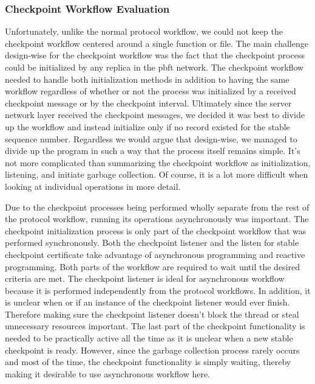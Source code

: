 \iffalse
\subsubsection{Checkpoint Workflow Evaluation}
\label{sec:checkpointEval}
Unfortunately, unlike the normal protocol workflow, we could not keep the checkpoint workflow centered around a single function or file. 
The main challenge design-wise for the checkpoint workflow was the fact that the checkpoint process could be initialized by any replica in the \ac{pbft} network. The checkpoint workflow needed to handle both initialization methods in addition to having the same workflow regardless of whether or not the process was initialized by a received checkpoint message or by the checkpoint interval. Ultimately since the server network layer received the checkpoint messages, we decided it was best to divide up the workflow and instead initialize only if no record existed for the stable sequence number. Regardless we would argue that design-wise, we managed to divide up the program in such a way that the process itself remains simple. It's not more complicated than summarizing the checkpoint workflow as initialization, listening, and initiate garbage collection. Of course, it is a lot more difficult when looking at individual operations in more detail. 

Due to the checkpoint processes being performed wholly separate from the rest of the protocol workflow, running its operations asynchronously was important. The checkpoint initialization process is only part of the checkpoint workflow that was performed synchronously. Both the checkpoint listener and the listen for stable checkpoint certificate take advantage of asynchronous programming and reactive programming. Both parts of the workflow are required to wait until the desired criteria are met. The checkpoint listener is ideal for asynchronous workflow because it is performed independently from the protocol workflows. In addition, it is unclear when or if an instance of the checkpoint listener would ever finish. Therefore making sure the checkpoint listener doesn't block the thread or steal unnecessary resources important.
The last part of the checkpoint functionality is needed to be practically active all the time as it is unclear when a new stable checkpoint is ready. However, since the garbage collection process rarely occurs and most of the time, the checkpoint functionality is simply waiting, thereby making it desirable to use asynchronous workflow here.

